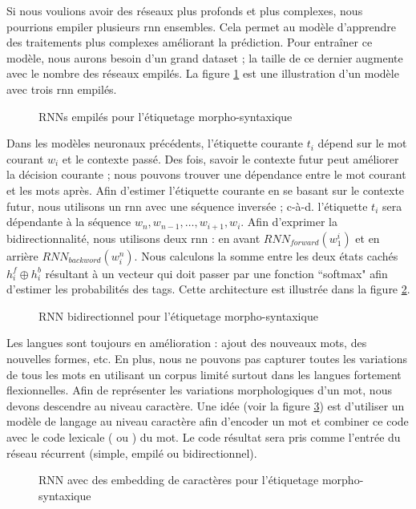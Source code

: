\documentclass{KodeBook}
\begin{document}
Si nous voulions avoir des réseaux plus profonds et plus complexes, nous pourrions empiler plusieurs \ac{rnn} ensembles. 
Cela permet au modèle d'apprendre des traitements plus complexes améliorant la prédiction.
Pour entraîner ce modèle, nous aurons besoin d'un grand dataset ; la taille de ce dernier augmente avec le nombre des réseaux empilés.
La figure \ref{fig:pos-rnn2} est une illustration d'un modèle avec trois \ac{rnn} empilés.
\begin{figure}[!ht]
	\centering
	\caption[RNNs empilés pour l'étiquetage morpho-syntaxique]{RNNs empilés pour l'étiquetage morpho-syntaxique \cite{2019-jurafsky-martin}\label{fig:pos-rnn2}}
\end{figure}

Dans les modèles neuronaux précédents, l'étiquette courante $t_i$ dépend sur le mot courant $w_i$ et le contexte passé. 
Des fois, savoir le contexte futur peut améliorer la décision courante ; nous pouvons trouver une dépendance entre le mot courant et les mots après. 
Afin d'estimer l'étiquette courante en se basant sur le contexte futur, nous utilisons un \ac{rnn} avec une séquence inversée ; c-à-d. l'étiquette $t_i$ sera dépendante à la séquence $w_n, w_{n-1}, \ldots, w_{i+1}, w_{i}$. 
Afin d'exprimer la bidirectionnalité, nous utilisons deux \ac{rnn} : en avant $RNN_{forward}(w_1^i)$ et en arrière $RNN_{backword}(w_i^n)$. 
Nous calculons la somme entre les deux états cachés $h_i^f \oplus h_i^b$ résultant à un vecteur qui doit passer par une fonction ``softmax" afin d'estimer les probabilités des tags. 
Cette architecture est illustrée dans la figure \ref{fig:pos-rnn3}.
\begin{figure}[!ht]
	\centering
	\caption[RNN bidirectionnel pour l'étiquetage morpho-syntaxique]{RNN bidirectionnel pour l'étiquetage morpho-syntaxique \cite{2019-jurafsky-martin}\label{fig:pos-rnn3}}
\end{figure}

Les langues sont toujours en amélioration : ajout des nouveaux mots, des nouvelles formes, etc. 
En plus, nous ne pouvons pas capturer toutes les variations de tous les mots en utilisant un corpus limité surtout dans les langues fortement flexionnelles. 
Afin de représenter les variations morphologiques d'un mot, nous devons descendre au niveau caractère.
Une idée (voir la figure \ref{fig:pos-rnn4}) est d'utiliser un modèle de langage au niveau caractère afin d'encoder un mot et combiner ce code avec le code lexicale ( ou ) du mot. 
Le code résultat sera pris comme l'entrée du réseau récurrent (simple, empilé ou bidirectionnel).
\begin{figure}[ht]
	\centering
	\caption[Embedding de caractères pour l'étiquetage morpho-syntaxique]{RNN avec des embedding de caractères pour l'étiquetage morpho-syntaxique \cite{2019-jurafsky-martin}\label{fig:pos-rnn4}}
\end{figure}
\end{document}
